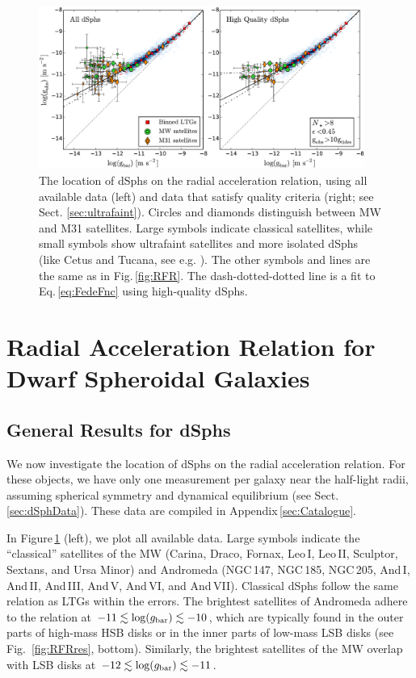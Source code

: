 \documentclass[apjl, twocolappendix]{emulateapj}
\begin{document}
\begin{figure}[thb]
\centering
\includegraphics[width=0.95\textwidth]{RAR_dSph.pdf}
\caption{The location of dSphs on the radial acceleration relation, using all available data (left) and data that satisfy quality criteria (right; see Sect.\,\,\ref{sec:ultrafaint}). Circles and diamonds distinguish between MW and M31 satellites. Large symbols indicate classical satellites, while small symbols show ultrafaint satellites and more isolated dSphs (like Cetus and Tucana, see e.g. \citealt{Pawlowski2014b}). The other symbols and lines are the same as in Fig.\,\ref{fig:RFR}. The dash-dotted-dotted line is a fit to Eq.\,\ref{eq:FedeFnc} using high-quality dSphs.}
\label{fig:dSphs}
\end{figure}
\section{Radial Acceleration Relation for Dwarf Spheroidal Galaxies}\label{sec:dSphs}

\subsection{General Results for dSphs}

We now investigate the location of dSphs on the radial acceleration relation. For these objects, we have only one measurement per galaxy near the half-light radii, assuming spherical symmetry and dynamical equilibrium (see Sect.\,\ref{sec:dSphData}). These data are compiled in Appendix\,\ref{sec:Catalogue}.

In Figure\,\ref{fig:dSphs} (left), we plot all available data. Large symbols indicate the ``classical'' satellites of the MW (Carina, Draco, Fornax, Leo\,I, Leo\,II, Sculptor, Sextans, and Ursa Minor) and Andromeda (NGC\,147, NGC\,185, NGC\,205, And\,I, And\,II, And\,III, And\,V,  And\,VI, and And\,VII). Classical dSphs follow the same relation as LTGs within the errors. The brightest satellites of Andromeda adhere to the relation at $-11 \lesssim \log(g_{\rm bar}) \lesssim -10$, which are typically found in the outer parts of high-mass HSB disks or in the inner parts of low-mass LSB disks (see Fig.~\ref{fig:RFRres}, bottom). Similarly, the brightest satellites of the MW  overlap with LSB disks at $-12 \lesssim \log(g_{\rm bar}) \lesssim -11$.
\end{document}
